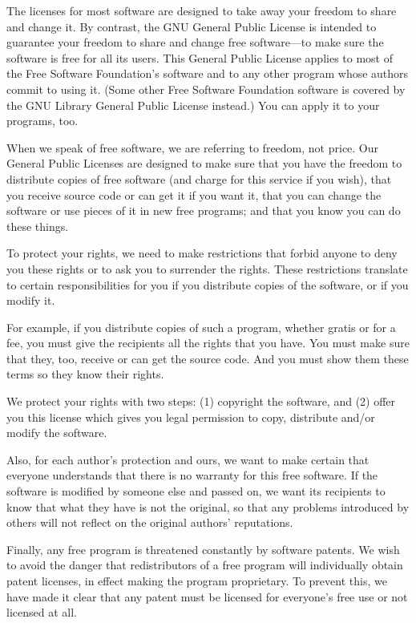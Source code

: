 \documentclass[12pt]{report}
\begin{document}
The licenses for most software are designed to take away your freedom to
share and change it.  By contrast, the GNU General Public License is
intended to guarantee your freedom to share and change free software---to
make sure the software is free for all its users.  This General Public
License applies to most of the Free Software Foundation's software and to
any other program whose authors commit to using it.  (Some other Free
Software Foundation software is covered by the GNU Library General Public
License instead.)  You can apply it to your programs, too.

When we speak of free software, we are referring to freedom, not price.
Our General Public Licenses are designed to make sure that you have the
freedom to distribute copies of free software (and charge for this service
if you wish), that you receive source code or can get it if you want it,
that you can change the software or use pieces of it in new free programs;
and that you know you can do these things.

To protect your rights, we need to make restrictions that forbid anyone to
deny you these rights or to ask you to surrender the rights.  These
restrictions translate to certain responsibilities for you if you
distribute copies of the software, or if you modify it.

For example, if you distribute copies of such a program, whether gratis or
for a fee, you must give the recipients all the rights that you have.  You
must make sure that they, too, receive or can get the source code.  And
you must show them these terms so they know their rights.

We protect your rights with two steps: (1) copyright the software, and (2)
offer you this license which gives you legal permission to copy,
distribute and/or modify the software.

Also, for each author's protection and ours, we want to make certain that
everyone understands that there is no warranty for this free software.  If
the software is modified by someone else and passed on, we want its
recipients to know that what they have is not the original, so that any
problems introduced by others will not reflect on the original authors'
reputations.

Finally, any free program is threatened constantly by software patents.
We wish to avoid the danger that redistributors of a free program will
individually obtain patent licenses, in effect making the program
proprietary.  To prevent this, we have made it clear that any patent must
be licensed for everyone's free use or not licensed at all.
\end{document}
